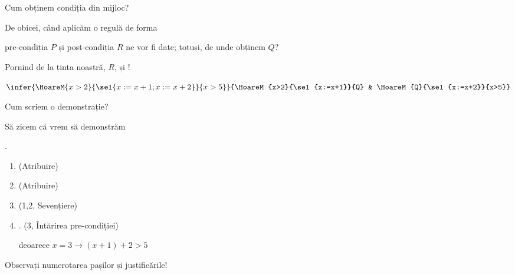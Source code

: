 \begin{frame}{Cum obținem condiția din mijloc?}

De obicei, când aplicăm o regulă de forma
\begin{center}
\end{center}
pre-condiția $P$ și post-condiția $R$ ne vor fi date; totuși, de unde obținem $Q$?

\pause
Pornind de la ținta noastră, $R$, și !

\begin{center}
$\infer{\HoareM{x>2}{\sel{x:=x+1 ; x:=x+2}}{x>5}}{\HoareM{x>2}{\sel{x:=x+1}}{Q} & \HoareM{Q}{\sel{x:=x+2}}{x>5}}$
\end{center}
 
\end{frame}

\begin{frame}{Cum scriem o demonstrație?}

\vspace{-.6cm}
\begin{example}
Să zicem că vrem să demonstrăm
\begin{center}
.
\end{center}

\pause
\begin{enumerate}[<+->]
	\item {} \hfill (Atribuire)
	\item {} \hfill (Atribuire)
	\item {} \hfill (1,2, Sevențiere)
	\item {}. \hfill{(3, Întărirea pre-condiției)}

	deoarece $x=3 \to (x+1) + 2 > 5$
\end{enumerate}
\end{example}

Observați numerotarea pașilor și justificările!
\end{frame}

